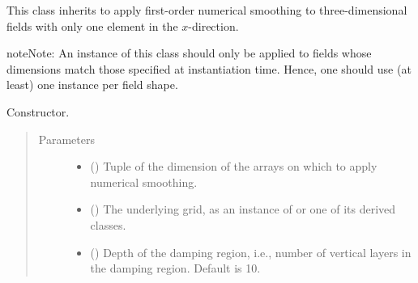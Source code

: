 \documentclass[letterpaper,10pt,english]{sphinxmanual}
\begin{document}

\begin{fulllineitems}
\label{\detokenize{api:dycore.horizontal_smoothing.HorizontalSmoothingFirstOrderYZ}}
This class inherits {\hyperref[\detokenize{api:dycore.horizontal_smoothing.HorizontalSmoothing}]{}} to apply first-order numerical smoothing to
three-dimensional fields with only one element in the \(x\)-direction.

\begin{sphinxadmonition}{note}{Note:}
An instance of this class should only be applied to fields whose dimensions match those specified at instantiation time.
Hence, one should use (at least) one instance per field shape.
\end{sphinxadmonition}

\begin{fulllineitems}
\label{\detokenize{api:dycore.horizontal_smoothing.HorizontalSmoothingFirstOrderYZ.__init__}}
Constructor.
\begin{quote}\begin{description}
\item[{Parameters}] \leavevmode\begin{itemize}
\item {} 
 () \textendash{} Tuple of the dimension of the arrays on which to apply numerical smoothing.

\item {} 
 () \textendash{} The underlying grid, as an instance of {\hyperref[\detokenize{api:grids.grid_xyz.GridXYZ}]{}} or one of its derived classes.

\item {} 
 () \textendash{} Depth of the damping region, i.e., number of vertical layers in the damping region. Default is 10.


\end{itemize}
\end{description}
\end{quote}
\end{fulllineitems}
\end{fulllineitems}
\end{document}
